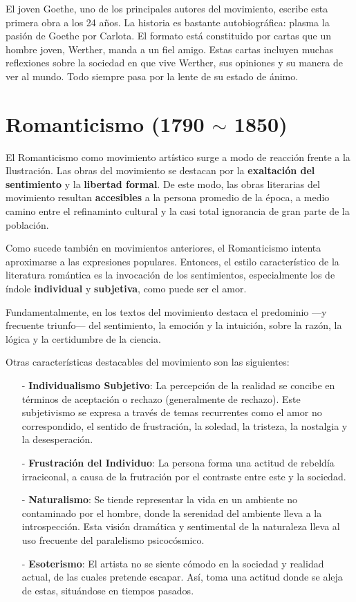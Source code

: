\documentclass{article}
\begin{document}
El joven Goethe, uno de los principales autores del movimiento, escribe esta primera obra a los 24 años. La historia es bastante autobiográfica: plasma la pasión de Goethe por Carlota. El formato está constituido por cartas que un hombre joven, Werther, manda a un fiel amigo. Estas cartas incluyen muchas reflexiones sobre la sociedad en que vive Werther, sus opiniones y su manera de ver al mundo. Todo siempre pasa por la lente de su estado de ánimo.

\section{Romanticismo (1790 $\bm{\sim}$ 1850)}

El Romanticismo como movimiento artístico surge a modo de reacción frente a la Ilustración. Las obras del movimiento se destacan por la \textbf{exaltación del sentimiento} y la \textbf{libertad formal}. De este modo, las obras literarias del movimiento resultan \textbf{accesibles} a la persona promedio de la época, a medio camino entre el refinaminto cultural y la casi total ignorancia de gran parte de la población.

Como sucede también en movimientos anteriores, el Romanticismo intenta aproximarse a las expresiones populares. Entonces, el estilo característico de la literatura romántica es la invocación de los sentimientos, especialmente los de índole \textbf{individual} y \textbf{subjetiva}, como puede ser el amor.

Fundamentalmente, en los textos del movimiento destaca el predominio ---y frecuente triunfo--- del sentimiento, la emoción y la intuición, sobre la razón, la lógica y la certidumbre de la ciencia.

Otras características destacables del movimiento son las siguientes:

\begin{itemize}
    \item[-] \textbf{Individualismo Subjetivo}: La percepción de la
    realidad se concibe en términos de aceptación o rechazo (generalmente de rechazo). Este subjetivismo se expresa a través de temas recurrentes como el amor no correspondido, el sentido de frustración, la soledad, la tristeza, la nostalgia y la desesperación.
    \item[-] \textbf{Frustración del Individuo}: La persona forma una actitud de rebeldía irraciconal, a causa de la frutración por el contraste entre este y la sociedad.
    \item[-] \textbf{Naturalismo}: Se tiende representar la vida en un ambiente no contaminado por el hombre, donde la serenidad del ambiente lleva a la introspección. Esta visión dramática y sentimental de la naturaleza lleva al uso frecuente del paralelismo psicocósmico.
    \item[-]  \textbf{Esoterismo}: El artista no se siente cómodo en la sociedad y realidad actual, de las cuales pretende escapar. Así, toma una actitud donde se aleja de estas, situándose en tiempos pasados.
\end{itemize}
\end{document}
